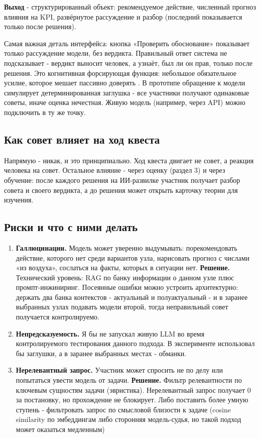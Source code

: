 \documentclass[12pt,a4paper]{article}
\begin{document}
\textbf{Выход} - структурированный объект: рекомендуемое действие, численный прогноз влияния на KPI, развёрнутое рассуждение и разбор (последний показывается только после решения). 

Самая важная деталь интерфейса: кнопка «Проверить обоснование» показывает только рассуждение модели, без вердикта. Правильный ответ система не подсказывает - вердикт выносит человек, а узнаёт, был ли он прав, только после решения. Это когнитивная форсирующая функция: небольшое обязательное усилие, которое мешает пассивно доверять \cite{bucinca2021, bucinca2025}. В прототипе обращение к модели симулирует детерминированная заглушка - все участники получают одинаковые советы, иначе оценка нечестная. Живую модель (например, через API) можно подключить в ту же точку.

\subsection{Как совет влияет на ход квеста}

Напрямую - никак, и это принципиально. Ход квеста двигает не совет, а реакция человека на совет. Остальное влияние - через оценку (раздел 3) и через обучение: после каждого решения на ИИ-развилке участник получает разбор совета и своего вердикта, а до решения может открыть карточку теории для изучения. 

\subsection{Риски и что с ними делать}

\begin{enumerate}[leftmargin=*]
    \item \textbf{Галлюцинации.} Модель может уверенно выдумывать: порекомендовать действие, которого нет среди вариантов узла, нарисовать прогноз с числами «из воздуха», сослаться на факты, которых в ситуации нет. \textbf{Решение.} Технический уровень: RAG по банку информации о данном узле плюс промпт-инжиниринг. Посеянные ошибки можно устроить архитектурно: держать два банка контекстов - актуальный и полуактуальный - и в заранее выбранных узлах подавать модели второй, тогда неправильный совет получается контролируемо. 

    \item \textbf{Непредсказуемость.} Я бы не запускал живую LLM во время контролируемого тестирования данного подхода. В эксперименте использовал бы заглушки, а в заранее выбранных местах - обманки. 

    \item \textbf{Нерелевантный запрос.} Участник может спросить не по делу или попытаться увести модель от задачи. \textbf{Решение.} Фильтр релевантности по ключевым сущностям задачи (эвристика). Нерелевантный запрос получает 0 за постановку, но прохождение не блокирует. Либо поставить более умную ступень - фильтровать запрос по смысловой близости к задаче (cosine similarity по эмбеддингам либо сторонняя модель-судья, но такой подход может оказаться медленным)

\end{enumerate}
\end{document}
